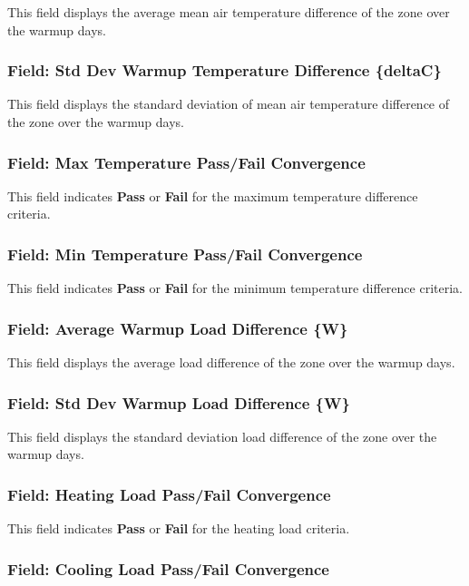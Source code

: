 This field displays the average mean air temperature difference of the zone over the warmup days.

\subsubsection{Field: Std Dev Warmup Temperature Difference \{deltaC\}}

This field displays the standard deviation of mean air temperature difference of the zone over the warmup days.

\subsubsection{Field: Max Temperature Pass/Fail Convergence}

This field indicates \textbf{Pass} or \textbf{Fail} for the maximum temperature difference criteria.

\subsubsection{Field: Min Temperature Pass/Fail Convergence}

This field indicates \textbf{Pass} or \textbf{Fail} for the minimum temperature difference criteria.

\subsubsection{Field: Average Warmup Load Difference \{W\}}

This field displays the average load difference of the zone over the warmup days.

\subsubsection{Field: Std Dev Warmup Load Difference \{W\}}

This field displays the standard deviation load difference of the zone over the warmup days.

\subsubsection{Field: Heating Load Pass/Fail Convergence}

This field indicates \textbf{Pass} or \textbf{Fail} for the heating load criteria.

\subsubsection{Field: Cooling Load Pass/Fail Convergence}

